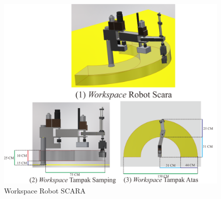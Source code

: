  \begin{figure}[H]
	\centering
	\includegraphics[width=13cm]{gambar/WORKSPACE.png}
	\caption{Workspace Robot SCARA}
	\label{pic.workpace}
\end{figure}


